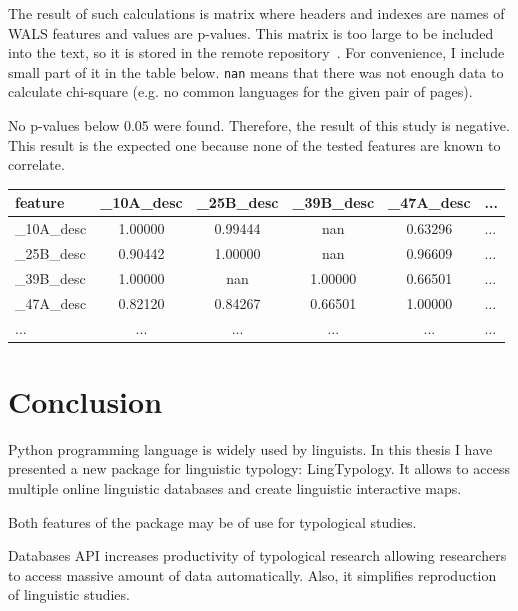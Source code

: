 \documentclass[a4paper,12pt]{article}
\begin{document}
The result of such calculations is matrix where headers and indexes are names of WALS features and values are p-values. This matrix is too large to be included into the text, so it is stored in the remote repository~\parencite[WALS: Quantitative Research.ipynb]{lingtypologyResearch}. For convenience, I include small part of it in the table below. \texttt{nan} means that there was not enough data to calculate chi-square (e.g. no common languages for the given pair of pages).

No p-values below 0.05 were found. Therefore, the result of this study is negative. This result is the expected one because none of the tested features are known to correlate.

\noindent
\begin{minipage}{\textwidth}
\begin{tabular}{|l|cccc|l|}
\hline
feature & \_10A\_desc & \_25B\_desc & \_39B\_desc & \_47A\_desc & ... \\
\hline
\_10A\_desc &   1.00000 &   0.99444 &       nan &   0.63296 &   ... \\
\_25B\_desc &   0.90442 &   1.00000 &       nan &   0.96609 &   ... \\
\_39B\_desc &   1.00000 &       nan &   1.00000 &   0.66501 &   ... \\
\_47A\_desc &   0.82120 &   0.84267 &   0.66501 &   1.00000 &   ... \\
\hline
... &   ... &   ... &       ... &   ... &   ... \\
\hline
\end{tabular}
\end{minipage}

\newpage

\section{Conclusion}

Python programming language is widely used by linguists. In this thesis I have presented a new package for linguistic typology: LingTypology. It allows to access multiple online linguistic databases and create linguistic interactive maps.

Both features of the package may be of use for typological studies.

Databases API increases productivity of typological research allowing researchers to access massive amount of data automatically. Also, it simplifies reproduction of linguistic studies.
\end{document}
